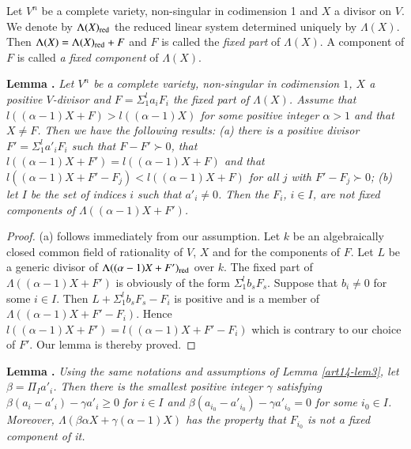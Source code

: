 Let $V^{n}$ be a complete variety, non-singular in codimension 1 and $X$ a divisor on $V$. We denote by $\Lambda(X)_{\operatorname{\mathrm{red}}}$ the reduced linear system determined uniquely by $\Lambda(X)$. Then $\Lambda(X)=\Lambda(X)_{\operatorname{\mathrm{red}}}+F$ and $F$ is called the {\em fixed part} of $\Lambda(X)$. A component of $F$ is called {\em a fixed component} of $\Lambda(X)$.

\medskip
\noindent
{\bf Lemma .\label{art14-lem3}}
{\em Let $V^{n}$ be a complete variety, non-singular in codimension $1$, $X$ a positive $V$-divisor and $F=\Sigma^{l}_{1}a_{i}F_{i}$ the fixed part of $\Lambda(X)$. Assume that $l((\alpha-1)X+F)>l((\alpha-1)X)$ for some positive integer $\alpha>1$ and that $X\neq F$. Then we have the following results: {\rm(a)} there is a positive divisor $F'=\Sigma^{l}_{1}a'_{i}F_{i}$ such that $F-F'\succ 0$, that $l((\alpha-1)X+F')=l((\alpha-1)X+F)$ and that $l((\alpha-1)X+F'-F_{j})<l((\alpha-1)X+F)$ for all $j$ with $F'-F_{j}\succ 0$; {\rm(b)} let $I$ be the set of indices $i$ such that $a'_{i}\neq 0$. Then the $F_{i}$, $i\in I$, are not fixed components of $\Lambda((\alpha-1)X+F')$.}

\begin{proof}
(a) follows immediately from our assumption. Let $k$ be an algebraically closed common field of rationality of $V$, $X$ and for the components of $F$. Let $L$ be a generic divisor of $\Lambda((\alpha-1)X+F')_{\operatorname{\mathrm{red}}}$ over $k$. The fixed part of $\Lambda((\alpha-1)X+F')$ is obviously of the form $\Sigma^{l}_{1}b_{s}F_{s}$. Suppose that $b_{i}\neq 0$ for some $i\in I$. Then $L+\Sigma^{l}_{1}b_{s}F_{s}-F_{i}$ is positive and is a member of $\Lambda((\alpha-1)X+F'-F_{i})$. Hence $l((\alpha-1)X+F')=l((\alpha-1)X+F'-F_{i})$ which is contrary to our choice of $F'$. Our lemma is thereby proved.
\end{proof}

\medskip
\noindent
{\bf Lemma .\label{art14-lem4}}
{\em Using the same notations and assumptions of Lemma \ref{art14-lem3}, let $\beta=\Pi_{I}a'_{i}$. Then there is the smallest positive integer $\gamma$ satisfying $\beta(a_{i}-a'_{i})-\gamma a'_{i}\geq 0$ for $i\in I$ and $\beta(a_{i_{0}}-a'_{i_{0}})-\gamma a'_{i_{0}}=0$ for some $i_{0}\in I$. Moreover, $\Lambda(\beta\alpha X+\gamma(\alpha-1)X)$ has the property that $F_{i_{0}}$ is not a fixed component of it.}

